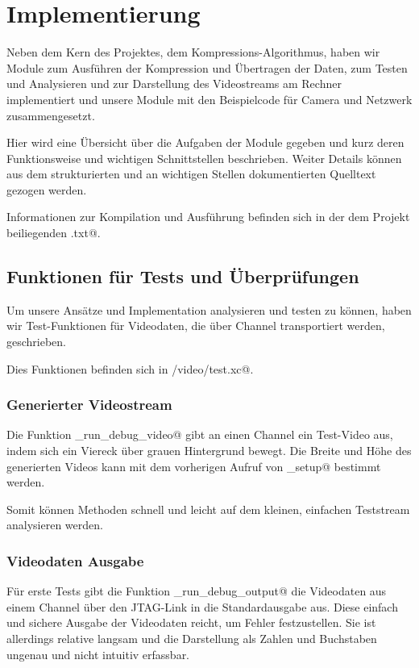 
\chapter{Implementierung}

Neben dem Kern des Projektes, dem Kompressions-Algorithmus, 
haben wir Module zum Ausführen der Kompression und Übertragen der Daten,
zum Testen und Analysieren und zur Darstellung des Videostreams am Rechner
implementiert und unsere Module mit den Beispielcode für Camera und Netzwerk
zusammengesetzt.

Hier wird eine Übersicht über die Aufgaben der Module gegeben und 
kurz deren Funktionsweise und wichtigen Schnittstellen beschrieben.
Weiter Details können aus dem strukturierten und an wichtigen Stellen
dokumentierten Quelltext gezogen werden.

Informationen zur Kompilation und Ausführung befinden sich in der dem 
Projekt beiliegenden \verb@README.txt@.

\section{Funktionen für Tests und Überprüfungen}
Um unsere Ansätze und Implementation analysieren und testen zu können,
haben wir Test-Funktionen für Videodaten, die über Channel transportiert
werden, geschrieben.

Dies Funktionen befinden sich in \verb@board/video/test.xc@.

\subsection{Generierter Videostream}
Die Funktion \lstinline@tst_run_debug_video@ gibt an einen Channel ein Test-Video aus,
indem sich ein Viereck über grauen Hintergrund bewegt.
Die Breite und Höhe des generierten Videos kann mit dem vorherigen Aufruf von
\lstinline@tst_setup@ bestimmt werden. 

Somit können Methoden schnell und leicht auf dem kleinen, einfachen
Teststream analysieren werden.

\subsection{Videodaten Ausgabe}
Für erste Tests gibt die Funktion \lstinline@tst_run_debug_output@ die
Videodaten aus einem Channel über den JTAG-Link in die Standardausgabe aus.
Diese einfach und sichere Ausgabe der Videodaten reicht, um Fehler
festzustellen. 
Sie ist allerdings relative langsam und die Darstellung als Zahlen und Buchstaben
ungenau und nicht intuitiv erfassbar.

